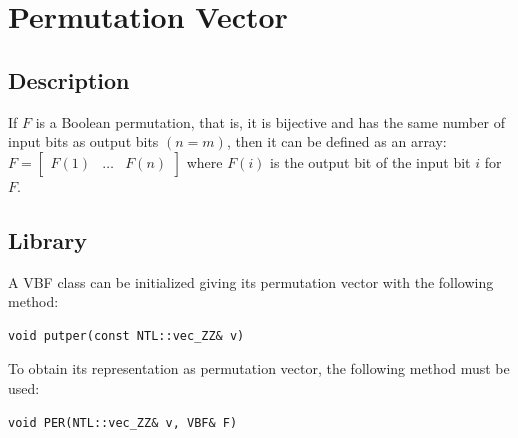 \section{Permutation Vector}
\label{sec:PV}

\subsection{Description}

If $F$ is a Boolean permutation, that is, it is bijective and has the same number of input bits as output bits $(n=m)$, then it can be defined as an array: $F = \begin{bmatrix} F(1) & \dots & F(n) \end{bmatrix}$ where $F(i)$ is the output bit of the input bit $i$ for $F$. 

\subsection{Library}

A VBF class can be initialized giving its permutation vector with the following method:

\begin{verbatim}
void putper(const NTL::vec_ZZ& v)
\end{verbatim}

To obtain its representation as permutation vector, the following method must be used:

\begin{verbatim}
void PER(NTL::vec_ZZ& v, VBF& F)
\end{verbatim}

